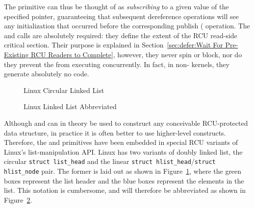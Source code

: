 The  primitive can thus be thought of
as \emph{subscribing} to a given value of the specified pointer,
guaranteeing that subsequent dereference operations will see any
initialization that occurred before the corresponding publish
( operation.
The  and 
calls are absolutely required: they define the extent of the
RCU read-side critical section.
Their purpose is explained in
Section~\ref{sec:defer:Wait For Pre-Existing RCU Readers to Complete},
however, they never spin or block, nor do they prevent the
 from executing concurrently.
In fact, in non- kernels, they generate
absolutely no code.

\begin{figure}[tb]
\begin{center}
\end{center}
\caption{Linux Circular Linked List}
\label{fig:defer:Linux Circular Linked List}
\end{figure}

\begin{figure}[tb]
\begin{center}
\end{center}
\caption{Linux Linked List Abbreviated}
\label{fig:defer:Linux Linked List Abbreviated}
\end{figure}

Although  and
 can in theory be used to construct any
conceivable RCU-protected data structure, in practice it is often better
to use higher-level constructs.
Therefore, the  and
primitives have been embedded in special RCU variants of Linux's
list-manipulation API.
Linux has two variants of doubly linked list, the circular
{\tt struct list\_head} and the linear
{\tt struct hlist\_head}/{\tt struct hlist\_node} pair.
The former is laid out as shown in
Figure~\ref{fig:defer:Linux Circular Linked List},
where the green boxes represent
the list header and the blue boxes represent the elements in the
list.
This notation is cumbersome, and will therefore be abbreviated as shown in
Figure~\ref{fig:defer:Linux Linked List Abbreviated}.

